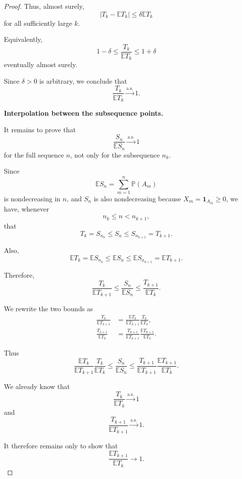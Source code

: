 \begin{proof}
Thus, almost surely,
\[
    |T_k-\mathbb E T_k|
    \leq
    \delta\mathbb E T_k
\]
for all sufficiently large $k$.

Equivalently,
\[
    1-\delta
    \leq
    \frac{T_k}{\mathbb E T_k}
    \leq
    1+\delta
\]
eventually almost surely.

Since $\delta>0$ is arbitrary, we conclude that
\[
    \boxed{
    \frac{T_k}{\mathbb E T_k}
    \xrightarrow{\mathrm{a.s.}}1.
    }
\]

\medskip

\noindent
\textbf{Interpolation between the subsequence points.}

It remains to prove that
\[
    \frac{S_n}{\mathbb E S_n}
    \xrightarrow{\mathrm{a.s.}}1
\]
for the full sequence $n$, not only for the subsequence $n_k$.

Since
\[
    \mathbb E S_n
    =
    \sum_{m=1}^{n}\mathbb P(A_m)
\]
is nondecreasing in $n$, and $S_n$ is also nondecreasing because
$X_m=\mathbf{1}_{A_m}\geq0$, we have, whenever
\[
    n_k\leq n<n_{k+1},
\]
that
\[
    T_k
    =
    S_{n_k}
    \leq
    S_n
    \leq
    S_{n_{k+1}}
    =
    T_{k+1}.
\]

Also,
\[
    \mathbb E T_k
    =
    \mathbb E S_{n_k}
    \leq
    \mathbb E S_n
    \leq
    \mathbb E S_{n_{k+1}}
    =
    \mathbb E T_{k+1}.
\]

Therefore,
\[
    \frac{T_k}{\mathbb E T_{k+1}}
    \leq
    \frac{S_n}{\mathbb E S_n}
    \leq
    \frac{T_{k+1}}{\mathbb E T_k}.
\]

We rewrite the two bounds as
\[
\begin{aligned}
    \frac{T_k}{\mathbb E T_{k+1}}
    &=
    \frac{\mathbb E T_k}
         {\mathbb E T_{k+1}}
    \frac{T_k}{\mathbb E T_k},
    \\[6pt]
    \frac{T_{k+1}}{\mathbb E T_k}
    &=
    \frac{T_{k+1}}
         {\mathbb E T_{k+1}}
    \frac{\mathbb E T_{k+1}}
         {\mathbb E T_k}.
\end{aligned}
\]

Thus
\[
    \boxed{
    \frac{\mathbb E T_k}
         {\mathbb E T_{k+1}}
    \frac{T_k}{\mathbb E T_k}
    \leq
    \frac{S_n}{\mathbb E S_n}
    \leq
    \frac{T_{k+1}}
         {\mathbb E T_{k+1}}
    \frac{\mathbb E T_{k+1}}
         {\mathbb E T_k}.
    }
\]

We already know that
\[
    \frac{T_k}{\mathbb E T_k}
    \xrightarrow{\mathrm{a.s.}}1
\]
and
\[
    \frac{T_{k+1}}{\mathbb E T_{k+1}}
    \xrightarrow{\mathrm{a.s.}}1.
\]

It therefore remains only to show that
\[
    \frac{\mathbb E T_{k+1}}
         {\mathbb E T_k}
    \longrightarrow1.
\]


\end{proof}
